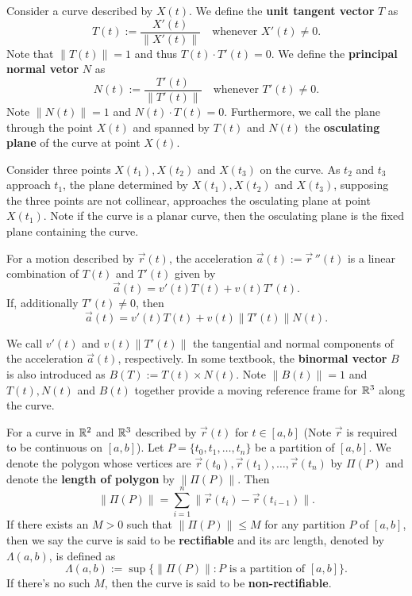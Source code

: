 \documentclass[a4paper]{ctexart}
\begin{document}
    \begin{mydef}
        Consider a curve described by $X(t)$. We define the \textbf{unit tangent vector} $T$ as $$T(t) := \dfrac{X'(t)}{\| X'(t)\|} \quad \text{whenever } X'(t) \ne 0. $$ Note that $\| T(t) \| = 1$ and thus $T(t) \cdot T'(t) = 0$. We define the \textbf{principal normal vetor} $N$ as
        $$ N(t) := \frac{T'(t)}{\| T'(t)\|} \quad \text{whenever } T'(t) \ne 0. $$
        Note $\left\|N(t)\right\| =1$ and $N(t) \cdot T(t) = 0$. Furthermore, we call the plane through the point $X(t)$ and spanned by $T(t)$ and $N(t)$ the \textbf{osculating plane} of the curve at point $X(t)$. 
    \end{mydef}
    \begin{myrmk}
        Consider three points $X(t_1), X(t_2)$ and $X(t_3)$ on the curve. As $t_2 $ and $t_3$ approach $t_1$, the plane determined by $X(t_1), X(t_2)$ and $X(t_3)$, supposing the three points are not collinear, approaches the osculating plane at point $X(t_1)$. Note if the curve is a planar curve, then the osculating plane is the fixed plane containing the curve.
    \end{myrmk}
    \begin{mythm}
        For a motion described by $\vec r(t)$, the acceleration $\vec a(t) := \vec r\,''(t)$ is a linear combination of $T(t)$ and $T'(t)$ given by $$ \vec a(t) = v'(t) T(t) + v(t) T'(t). $$
        If, additionally $T'(t) \ne 0$, then
        $$ \vec a(t) = v'(t) T(t) + v(t) \| T'(t)\| N(t). $$
    \end{mythm}
    \begin{myrmk}
        We call $v'(t)$ and $v(t) \| T'(t)\|$ the tangential and normal components of the acceleration $\vec a(t)$, respectively. In some textbook, the \textbf{binormal vector} $B$ is also introduced as $B(T) := T(t) \times N(t)$. Note $\left\| B(t) \right\|=1$ and $T(t), N(t)$ and $B(t)$ together provide a moving reference frame for $\mathbb{R}^3$ along the curve.
    \end{myrmk}
    \begin{mydef}
        For a curve in $\mathbb{R}^2$ and $\mathbb{R}^3$ described by $\vec r(t)$ for $t\in [a,b]$ (Note $\vec r$ is required to be continuous on $[a,b]$). Let $P=\{t_0, t_1, \ldots, t_n\}$ be a partition of $[a,b]$. We denote the polygon whose vertices are $\vec r(t_0), \vec r(t_1), \ldots, \vec r(t_n)$ by $\Pi (P)$ and denote the \textbf{length of polygon} by $\| \Pi (P)\|$. Then
        $$ \| \Pi (P)\| = \sum_{i=1}^n \| \vec r(t_i) - \vec r(t_{i-1})\|. $$
        If there exists an $M>0$ such that $\| \Pi (P)\| \le M$ for any partition $P$ of $[a,b]$, then we say the curve is said to be \textbf{rectifiable} and its arc length, denoted by $\Lambda(a,b)$, is defined as
        $$ \Lambda(a,b) := \sup \{ \| \Pi (P)\| : P \text{ is a partition of } [a,b]\}. $$
        If there's no such $M$, then the curve is said to be \textbf{non-rectifiable}.
    \end{mydef}
\end{document}

